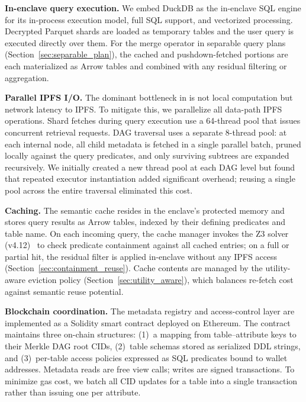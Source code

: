 \textbf{In-enclave query execution.}
We embed DuckDB as the in-enclave SQL engine for its in-process execution model, full SQL support, and vectorized processing.
Decrypted Parquet shards are loaded as temporary tables and the user query is executed directly over them.
For the merge operator in separable query plans (Section~\ref{sec:separable_plan}), the cached and pushdown-fetched portions are each materialized as Arrow tables and combined with any residual filtering or aggregation.

\textbf{Parallel IPFS I/O.}
The dominant bottleneck in \ours{} is not local computation but network latency to IPFS\@.
To mitigate this, we parallelize all data-path IPFS operations.
Shard fetches during query execution use a 64-thread pool that issues concurrent retrieval requests.
DAG traversal uses a separate 8-thread pool: at each internal node, all child metadata is fetched in a single parallel batch, pruned locally against the query predicates, and only surviving subtrees are expanded recursively.
We initially created a new thread pool at each DAG level but found that repeated executor instantiation added significant overhead; reusing a single pool across the entire traversal eliminated this cost.

\textbf{Caching.}
The semantic cache resides in the enclave's protected memory and stores query results as Arrow tables, indexed by their defining predicates and table name.
On each incoming query, the cache manager invokes the Z3 solver (v4.12)~\cite{de2008z3} to check predicate containment against all cached entries; on a full or partial hit, the residual filter is applied in-enclave without any IPFS access (Section~\ref{sec:containment_reuse}).
Cache contents are managed by the utility-aware eviction policy (Section~\ref{sec:utility_aware}), which balances re-fetch cost against semantic reuse potential.

\textbf{Blockchain coordination.}
\label{sec:impl_blockchain}
The metadata registry and access-control layer are implemented as a Solidity smart contract deployed on Ethereum.
The contract maintains three on-chain structures:
(1)~a mapping from table--attribute keys to their Merkle DAG root CIDs,
(2)~table schemas stored as serialized DDL strings, and
(3)~per-table access policies expressed as SQL predicates bound to wallet addresses.
Metadata reads are free view calls; writes are signed transactions.
To minimize gas cost, we batch all CID updates for a table into a single transaction rather than issuing one per attribute.


